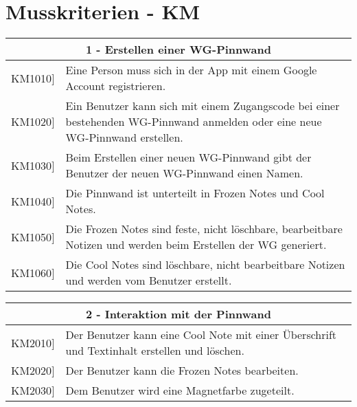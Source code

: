 \documentclass[a4paper]{scrreprt}
\begin{document}
        \section{Musskriterien - KM}
        \begin{table}[h!]
        	\centering
        	\label{my-label}
        	\begin{tabular}{p{2cm}p{12cm}}
        		
        		\multicolumn{2}{c}{\textbf{1 - Erstellen einer WG-Pinnwand}} \\ \hline
        		\centering{[}KM1010{]} & Eine Person muss sich in der App mit einem Google Account registrieren.\\
        		\centering{[}KM1020{]}& Ein Benutzer kann sich mit einem Zugangscode bei einer bestehenden WG-Pinnwand anmelden oder eine neue WG-Pinnwand erstellen.                                 \\
        		\centering{[}KM1030{]}& Beim Erstellen einer neuen WG-Pinnwand gibt der Benutzer der neuen WG-Pinnwand einen Namen.\\ 
        		\centering{[}KM1040{]}& Die Pinnwand ist unterteilt in Frozen Notes und Cool Notes.\\ 
        		\centering{[}KM1050{]}& Die Frozen Notes sind feste, nicht löschbare, bearbeitbare Notizen und werden beim Erstellen der WG generiert.\\ 
        		\centering{[}KM1060{]}& Die Cool Notes sind löschbare, nicht bearbeitbare Notizen und werden vom Benutzer erstellt.\\ 
        		\hline
        	\end{tabular}
        \end{table}
    
    	\vspace{5mm}
    	
    	\begin{table}[h!]
    		\centering
    		\label{my-label}
    		\begin{tabular}{p{2cm}p{12cm}}
    			
    			\multicolumn{2}{c}{\textbf{2 - Interaktion mit der Pinnwand}} \\ \hline
    			\centering{[}KM2010{]} & Der Benutzer kann eine Cool Note mit einer Überschrift und Textinhalt erstellen und löschen.\\
    			\centering{[}KM2020{]}& Der Benutzer kann die Frozen Notes bearbeiten.                                 \\
    			\centering{[}KM2030{]}& Dem Benutzer wird eine Magnetfarbe zugeteilt.\\ 
    			
    			\hline
    		\end{tabular}
    	\end{table}
    
\end{document}
